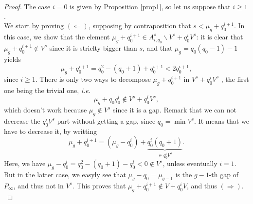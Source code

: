 \documentclass[a4paper]{article}
\begin{document}
\begin{proof} The case $i=0$ is given by Proposition \ref{prop1}, so let us suppose that $i \geq 1$. \\
We start by proving $(\Leftarrow)$, supposing by contraposition that $s < \mu_g + q_0^{i+1}$. In this case, we show that the element $\mu_g + q_0^{i+1} \in A^s_{i,q_0} \backslash V^s+q_0^iV^s$: it is clear that $\mu_g + q_0^{i+1} \notin V^s$ since it is striclty bigger than $s$, and that $\mu_g = q_0(q_0-1)-1$ yields
\[\mu_g + q_0^{i+1}=q_0^2-(q_0+1) + q_0^{i+1} < 2q_0^{i+1},\]
since $i \geq 1$. There is only two ways to decompose $\mu_g + q_0^{i+1}$ in $V^s+q_0^iV^s$ , the first one being the trivial one, \emph{i.e.}
\[\mu_g + q_0q_0^{i} \notin V^s+q_0^iV^s,\]
which doesn't work because $\mu_g \notin V^s$ since it is a gap. Remark that we can not decrease the $q_0^iV^s$ part without getting a gap, since $q_0 = \min{V^s}$. It means that we have to decrease it, by writting 
\[\mu_g + q_0^{i+1} = (\mu_g - q_0^i) + \underbrace{q_0^i(q_0+1)}_{\in q^i_0V^s} .\]
Here, we have $\mu_g - q_0^i = q_0^2-(q_0+1)-q_0^i <0 \notin V^s$, unless eventually $i=1$. But in the latter case, we easyly see that $\mu_g-q_0 = \mu_{g-1}$ is the $g-1$-th gap of $P_{\infty}$, and thus not in $V^s$. This proves that $\mu_g + q_0^{i+1} \notin V+q_0^iV$, and thus $(\Rightarrow)$. \\


\end{proof}
\end{document}
